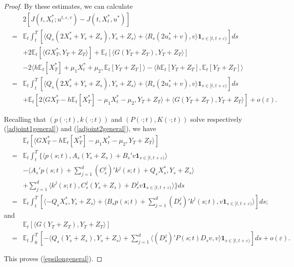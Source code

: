 \documentclass[final]{siamltex}
\begin{document}
\begin{proof}
By these  estimates, we can calculate
\begin{eqnarray*}
&&2[J(t,X^*_t; u^{t,\varepsilon,v})-J(t,X^*_t,u^*)]\\
&=&\mathbb E_t\int_t^T\left[{\langle  { Q_s (2X^*_s+Y_s+Z_s),  Y_s +Z_s } \rangle }
+{\langle  {  R_s (2u^*_s+ v),  v} \rangle }{{\mathbf 1}}_{s\in [t, t+\varepsilon)}    \right]ds\\
&& +2{\mathbb{E}_t\left[{{\langle  {G X^*_T,  Y_T+Z_T } \rangle }}\right]}  +{\mathbb{E}_t\left[{{\langle  {G (Y_T+Z_T), Y_T+Z_T} \rangle }}\right]}\\
&& - 2{\langle  {h{\mathbb{E}_t\left[{X^*_T}\right]}+\mu_1 X_t^*+\mu_2, {\mathbb{E}_t\left[{Y_T+Z_T}\right]}} \rangle }
 -{\langle  {h{\mathbb{E}_t\left[{Y_T+Z_T}\right]}, {\mathbb{E}_t\left[{Y_T+Z_T}\right]}} \rangle }\\
&=&\mathbb E_t\int_t^T\left[{\langle  { Q_s (2X^*_s+Y_s+Z_s),  Y_s +Z_s } \rangle }
+{\langle  {  R_s (2u^*_s+ v),  v} \rangle }{{\mathbf 1}}_{s\in [t, t+\varepsilon)}    \right]ds\\
&& +{\mathbb{E}_t\left[{2{\langle  {GX^*_T-h\mathbb E_t [X^*_T]-\mu_1 X_t^*-\mu_2, Y_T+Z_T } \rangle }  +{\langle  { G(Y_T+Z_T),Y_T+Z_T} \rangle }}\right]}+o(\varepsilon).
\end{eqnarray*}

Recalling that  $(p(\cdot; t),k(\cdot; t))$ and $(P(\cdot; t),K(\cdot; t))$ solve respectively (\ref{adjoint1general}) and (\ref{adjoint2general}), we have
\begin{eqnarray*}
&&{\mathbb{E}_t\left[{{\langle  {GX^*_T-h{\mathbb{E}_t\left[{ X^*_T}\right]}-\mu_1 X_t^*-\mu_2, Y_T+Z_T} \rangle } }\right]}\\
&=&\mathbb E_t\int_t^T\{ {\langle  {p(s;t), A_s(Y_s+Z_s)+B_s' v{{\mathbf 1}}_{s\in [t, t+\varepsilon)} } \rangle }\\
&&-{\langle  { A_s' p(s;t)+\sum_{j=1}^d(C_s^j)' k^j(s;t)+Q_sX^*_s, Y_s+Z_s} \rangle }\\
&&+\sum_{j=1}^d{\langle  {k^j(s;t), C_s^j(Y_s+Z_s)+D_s^j v {{\mathbf 1}}_{s\in [t, t+\varepsilon)}} \rangle }\}ds \\
&=&\mathbb E_t\int_t^T[{\langle  {-Q_sX^*_s,  Y_s+Z_s} \rangle }+{\langle  { B_sp(s;t)+\sum_{j=1}^d(D_s^j)'k^j(s;t),  v {{\mathbf 1}}_{s\in [t, t+\varepsilon)}} \rangle }]ds;
\end{eqnarray*}
and
\begin{eqnarray*}
&&{\mathbb{E}_t\left[{{\langle  {G(Y_T+Z_T), Y_T+Z_T} \rangle }}\right]}\\
&=&\mathbb E_t\int_0^T\left[-{\langle  {Q_s(Y_s+Z_s), Y_s+Z_s} \rangle }+\sum_{j=1}^d {\langle  {(D_s^j)'P(s;t)D_s  v, v} \rangle }{{\mathbf 1}}_{s\in [t, t+\varepsilon)} \right]ds
+o(\varepsilon).
\end{eqnarray*}

This proves (\ref{epsilongeneral}).
\end{proof}
\end{document}
